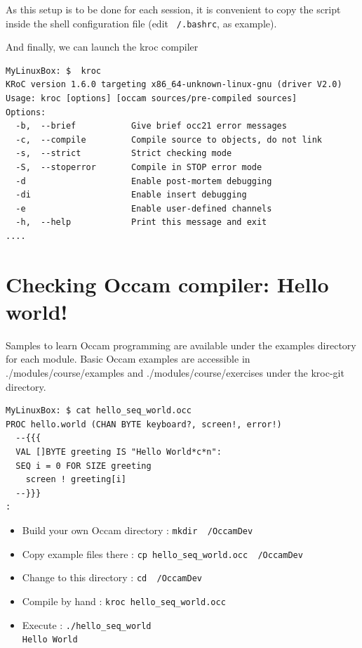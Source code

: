 \documentclass[times,a4paper]{book}
\begin{document}
\begin{enumerate}
As this setup is to be done for each session, it is convenient to copy the script
inside the shell configuration file (edit {\tt ~/.bashrc}, as example).


And finally, we can launch the kroc compiler
\begin{lstlisting} 
MyLinuxBox: $  kroc
KRoC version 1.6.0 targeting x86_64-unknown-linux-gnu (driver V2.0)
Usage: kroc [options] [occam sources/pre-compiled sources]
Options:
  -b,  --brief           Give brief occ21 error messages
  -c,  --compile         Compile source to objects, do not link
  -s,  --strict          Strict checking mode
  -S,  --stoperror       Compile in STOP error mode
  -d                     Enable post-mortem debugging
  -di                    Enable insert debugging
  -e                     Enable user-defined channels
  -h,  --help            Print this message and exit
....
\end{lstlisting} 


\end{enumerate}

\section{Checking Occam compiler: Hello world! }

Samples to learn Occam programming are available under the examples directory
for each module. Basic Occam examples are accessible in ./modules/course/examples
and ./modules/course/exercises
under  the kroc-git directory.

\begin{lstlisting} 
MyLinuxBox: $ cat hello_seq_world.occ
PROC hello.world (CHAN BYTE keyboard?, screen!, error!)
  --{{{
  VAL []BYTE greeting IS "Hello World*c*n":
  SEQ i = 0 FOR SIZE greeting
    screen ! greeting[i]
  --}}}
:
\end{lstlisting} 

\begin{itemize}
\item Build your own Occam directory : {\tt mkdir ~/OccamDev }
\item Copy example files there : {\tt cp hello\_seq\_world.occ ~/OccamDev }
\item Change to this directory :  {\tt cd ~/OccamDev }
\item Compile by hand : {\tt kroc hello\_seq\_world.occ }
\item Execute : {\tt  ./hello\_seq\_world \\
Hello World
}
\end{itemize}
\end{document}
